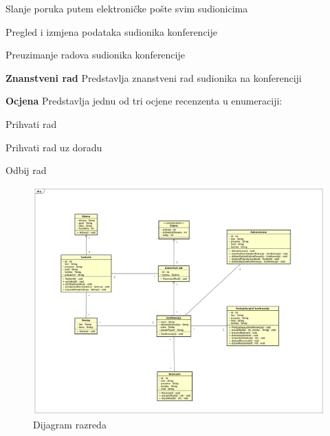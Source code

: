 \begin{packed_item}
\begin{packed_item}
					\item Slanje poruka putem elektroničke pošte svim sudionicima
					\item Pregled i izmjena podataka sudionika konferencije
					\item Preuzimanje radova sudionika konferencije
				\end{packed_item}
				\item \textbf{Znanstveni rad} Predstavlja znanstveni rad sudionika na konferenciji
				\item \textbf{Ocjena} Predstavlja jednu od  tri ocjene recenzenta u enumeraciji:
				\begin{packed_item}
					\item Prihvati rad
					\item Prihvati rad uz doradu
					\item Odbij rad
				\end{packed_item}
			\end{packed_item}
			
			\begin{figure}[H]
				\includegraphics[width=1\linewidth]{slike/ClassDiagramSlika} %
				\centering
				\caption{Dijagram razreda}
				\label{Class Diagram} %
			\end{figure}
		
			\eject
			
